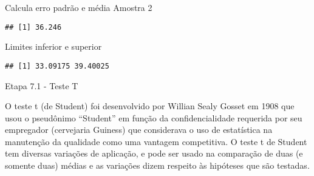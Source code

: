 \documentclass[]{article}
\newenvironment{Shaded}{\begin{snugshade}}{\end{snugshade}}
\newcommand{\DataTypeTok}[1]{\textcolor[rgb]{0.13,0.29,0.53}{#1}}
\newcommand{\FloatTok}[1]{\textcolor[rgb]{0.00,0.00,0.81}{#1}}
\newcommand{\KeywordTok}[1]{\textcolor[rgb]{0.13,0.29,0.53}{\textbf{#1}}}
\newcommand{\NormalTok}[1]{#1}
\newcommand{\OperatorTok}[1]{\textcolor[rgb]{0.81,0.36,0.00}{\textbf{#1}}}
\newcommand{\StringTok}[1]{\textcolor[rgb]{0.31,0.60,0.02}{#1}}
\begin{document}
Calcula erro padrão e média Amostra 2

\begin{Shaded}
\end{Shaded}

\begin{verbatim}
## [1] 36.246
\end{verbatim}

Limites inferior e superior

\begin{Shaded}
\end{Shaded}

\begin{verbatim}
## [1] 33.09175 39.40025
\end{verbatim}

Etapa 7.1 - Teste T

O teste t (de Student) foi desenvolvido por Willian Sealy Gosset em 1908
que usou o pseudônimo ``Student'' em função da confidencialidade
requerida por seu empregador (cervejaria Guiness) que considerava o uso
de estatística na manutenção da qualidade como uma vantagem competitiva.
O teste t de Student tem diversas variações de aplicação, e pode ser
usado na comparação de duas (e somente duas) médias e as variações dizem
respeito às hipóteses que são testadas.

\begin{Shaded}
\end{Shaded}
\end{document}
